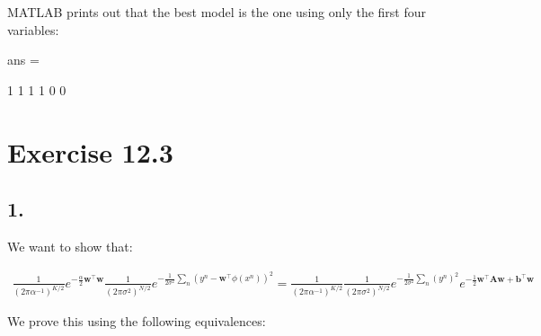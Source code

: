\documentclass[11pt,a4paper,oneside]{report}
\begin{document}
MATLAB prints out that the best model is the one using only the first four variables:

ans =

     1     1     1     1     0     0

\section*{Exercise 12.3}

\subsection*{1.}
We want to show that:

\begin{align*}\frac{1}{(2\pi \alpha^{-1})^{K/2}}e^{-\frac{\alpha}{2}\mathbf{w}^\top \mathbf{w}}\frac{1}{(2\pi \sigma^{2})^{N/2}}e^{-\frac{1}{2\sigma^2}\sum_n (y^n-\mathbf{w}^\top \phi(x^n))^2} =
\frac{1}{(2\pi \alpha^{-1})^{K/2}}\frac{1}{(2\pi \sigma^{2})^{N/2}}e^{-\frac{1}{2\sigma^2}\sum_n(y^n)^2}e^{-\frac{1}{2}\mathbf{w}^\top\mathbf{A}\mathbf{w}+\mathbf{b}^\top\mathbf{w}}
\end{align*}

We prove this using the following equivalences:
\end{document}

